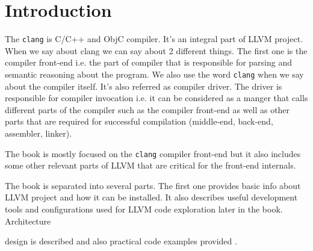 \chapter{Introduction}

The \texttt{clang} is C/C++ and ObjC compiler. It's an
integral part of LLVM 
project. When we say about clang we can say about 2 different
things. The first one is the compiler front-end i.e. the part of
compiler that is responsible for parsing and semantic reasoning about
the program. We also use the word \texttt{clang} when we say
about the compiler itself. It's also referred as compiler driver. The
driver is responsible for compiler invocation i.e. it can be
considered as a manger that calls different parts of the
compiler such as the compiler
front-end as well as other parts that are required for successful
compilation (middle-end, back-end, assembler, linker).

The book is mostly focused on the \texttt{clang} compiler
front-end but it also includes some other relevant parts of
LLVM that are critical for the front-end internals.

The book is separated into several parts. The first one provides basic
info about LLVM project and how it can be installed. It also describes
useful development tools and configurations used for LLVM code
exploration later in the book.
Architecture

design is described and also practical code examples provided
\cite{github:clangbook_src}.
